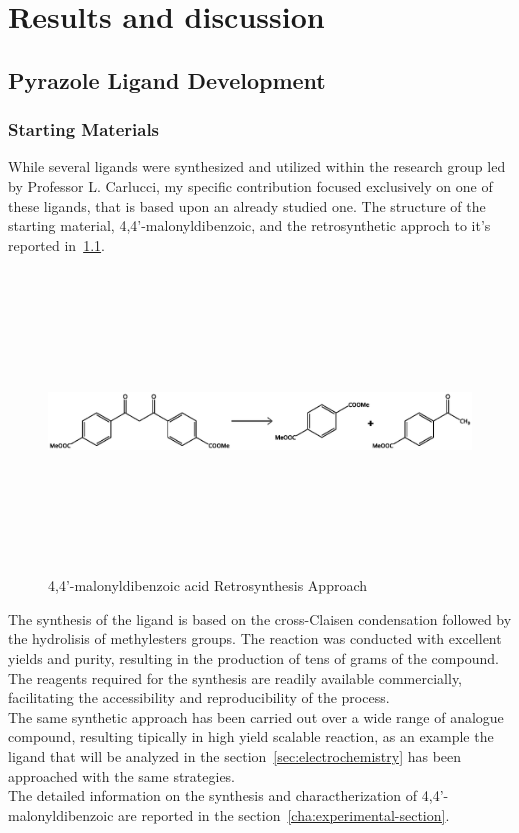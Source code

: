 \documentclass[../Master.tex]{subfiles}
\begin{document}
\afterpage{\blankpage}
\cleardoublepage

\chapter{Results and discussion}

\section{Pyrazole Ligand Development}\label{sec:pyr-dev}

\subsection{Starting Materials}\label{sec:starting-materials}

While several ligands were synthesized and utilized within the research group led by Professor L. Carlucci, my specific contribution focused exclusively on one of these ligands, that is based upon an already studied one. The structure of the starting material, 4,4’-malonyldibenzoic, and the retrosynthetic approch to it's reported in\ \ref{fig:dikest2-retro}.

\begin{figure}[h]
	\centering
	\includegraphics[width=16cm,height=8cm,keepaspectratio]{Structures/dikest2-retro.eps}
	\caption{4,4’-malonyldibenzoic acid Retrosynthesis Approach}\label{fig:dikest2-retro}
\end{figure}

The synthesis of the ligand is based on the cross-Claisen condensation followed by the hydrolisis of methylesters groups. The reaction was conducted with excellent yields and purity, resulting in the production of tens of grams of the compound. The reagents required for the synthesis are readily available commercially, facilitating the accessibility and reproducibility of the process. \\
The same synthetic approach has been carried out over a wide range of analogue compound, resulting tipically in high yield scalable reaction, as an example the ligand that will be analyzed in the section\ \ref{sec:electrochemistry} has been approached with the same strategies.\\
The detailed information on the synthesis and charactherization of 4,4’-malonyldibenzoic are reported in the section\ \ref{cha:experimental-section}.
\newpage
\end{document}
